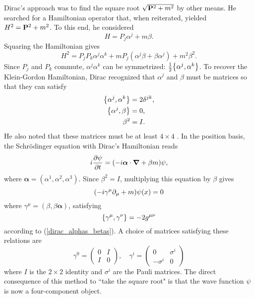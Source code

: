 Dirac's approach was to find the square root $\sqrt{\vb{P}^2+m^2}$ by other means. He searched for a Hamiltonian operator that, when reiterated, yielded $H^2=\vb{P}^2+m^2$. To this end, he considered 
\begin{equation}
    H=P_j\alpha^j+m\beta.
\end{equation}
Squaring the Hamiltonian gives
\begin{equation}
    H^2=P_jP_k\alpha^j\alpha^k+mP_j(\alpha^j\beta+\beta\alpha^j)+m^2\beta^2.
\end{equation}
Since $P_j$ and $P_k$ commute, $\alpha^j\alpha^k$ can be symmetrized: $\frac{1}{2}\pb{\alpha^j}{\alpha^k}$. To recover the Klein-Gordon Hamiltonian, Dirac recognized that $\alpha^j$ and $\beta$ must be matrices so that they can satisfy
\begin{equation}
    \begin{aligned}
    \pb{\alpha^j}{\alpha^k}&=2\delta^{jk},\\
    \pb{\alpha^j}{\beta}&=0,\\
    \beta^2&=I.
    \label{dirac_alphas_betas}
    \end{aligned}
\end{equation}
He also noted that these matrices must be at least $4\times4$ \cite{dirac28, srednicki2007quantum}. In the position basis, the Schrödinger equation with Dirac's Hamiltonian reads
\begin{equation}    
    i\pdv{\psi}{t}=(-i\boldsymbol{\alpha} \cdot \grad + \beta m)\psi,
\end{equation}
where $\boldsymbol{\alpha}=(\alpha^1,\alpha^2,\alpha^3)$. Since $\beta^2=I$, multiplying this equation by $\beta$ gives
\begin{equation}
    \qty(-i\gamma^\mu\partial_\mu+m)\psi(x)=0
\end{equation}
where $\gamma^\mu=(\beta,\beta\boldsymbol{\alpha})$, satisfying
\begin{equation}
    \pb{\gamma^\mu}{\gamma^\nu}=-2g^{\mu\nu}
\end{equation}
according to (\ref{dirac_alphas_betas}). A choice of matrices satisfying these relations are
\begin{equation}
\gamma^{0}=\left(\begin{array}{cc}
0 & I \\
I & 0
\end{array}\right), \quad \gamma^{i}=\left(\begin{array}{cc}
0 & \sigma^{i} \\
-\sigma^{i} & 0
\end{array}\right)
\end{equation}
where $I$ is the $2\times2$ identity and $\sigma^i$ are the Pauli matrices. The direct consequence of this method to ``take the square root" is that the wave function $\psi$ is now a four-component object.\\

